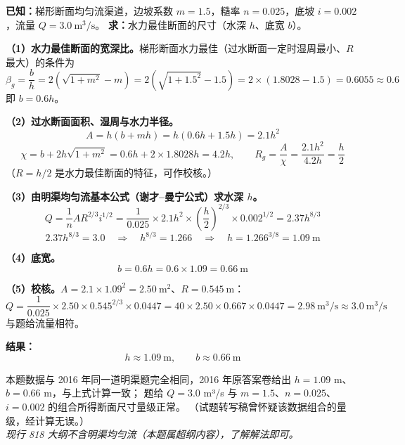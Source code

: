 \begin{jie}
\textbf{已知：}梯形断面均匀流渠道，边坡系数 $m=1.5$，糙率 $n=0.025$，底坡 $i=0.002$，流量 $Q=3.0\ \mathrm{m^3/s}$。
\textbf{求：}水力最佳断面的尺寸（水深 $h$、底宽 $b$）。

\textbf{（1）水力最佳断面的宽深比。}梯形断面水力最佳（过水断面一定时湿周最小、$R$ 最大）的条件为
\[
\beta_g=\frac{b}{h}=2\left(\sqrt{1+m^2}-m\right)
=2\left(\sqrt{1+1.5^2}-1.5\right)
=2\times\left(1.8028-1.5\right)=0.6055\approx0.6
\]
即 $b=0.6h$。

\textbf{（2）过水断面面积、湿周与水力半径。}
\[
A=h\left(b+mh\right)=h\left(0.6h+1.5h\right)=2.1h^2
\]
\[
\chi=b+2h\sqrt{1+m^2}=0.6h+2\times1.8028h=4.2h,
\qquad
R_g=\frac{A}{\chi}=\frac{2.1h^2}{4.2h}=\frac{h}{2}
\]
（$R=h/2$ 是水力最佳断面的特征，可作校核。）

\textbf{（3）由明渠均匀流基本公式（谢才--曼宁公式）求水深 $h$。}
\[
Q=\frac{1}{n}AR^{2/3}i^{1/2}
=\frac{1}{0.025}\times2.1h^2\times\left(\frac{h}{2}\right)^{2/3}\times0.002^{1/2}
=2.37h^{8/3}
\]
\[
2.37h^{8/3}=3.0
\quad\Longrightarrow\quad
h^{8/3}=1.266
\quad\Longrightarrow\quad
h=1.266^{3/8}=1.09\ \mathrm{m}
\]

\textbf{（4）底宽。}
\[
b=0.6h=0.6\times1.09=0.66\ \mathrm{m}
\]

\textbf{（5）校核。}$A=2.1\times1.09^2=2.50\ \mathrm{m^2}$、$R=0.545\ \mathrm{m}$：
\[
Q=\frac{1}{0.025}\times2.50\times0.545^{2/3}\times0.0447
=40\times2.50\times0.667\times0.0447=2.98\ \mathrm{m^3/s}\approx3.0\ \mathrm{m^3/s}
\]
与题给流量相符。

\textbf{结果：}
\[
\boxed{h\approx1.09\ \mathrm{m},\qquad b\approx0.66\ \mathrm{m}}
\]
\end{jie}

\begin{tishi}
本题数据与 2016 年同一道明渠题完全相同，2016 年原答案卷给出 $h=1.09$ m、$b=0.66$ m，与上式计算一致；
题给 $Q=3.0$ m³/s 与 $m=1.5$、$n=0.025$、$i=0.002$ 的组合所得断面尺寸量级正常。
（试题转写稿曾怀疑该数据组合的量级，经计算无误。）\\
\emph{现行 818 大纲不含明渠均匀流（本题属超纲内容），了解解法即可。}
\end{tishi}

